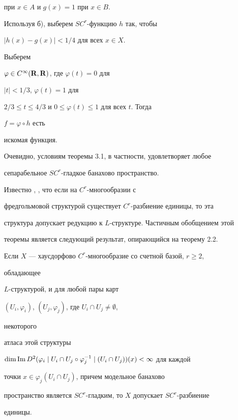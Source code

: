 \begin{pf}
при $x\in A$ и $g(x)=1$ при $x\in B$.


Используя б), выберем $SC^r$-функцию $h$ так, чтобы


$|h(x)-g(x)|<1/4$ для всех $x\in X$.


Выберем


$\varphi\in C^\infty(\bold R,\bold R)$, где $\varphi(t)=0$ для


$|t|<1/3$, $\varphi(t)=1$ для


$2/3\le t\le 4/3$ и $0\le\varphi(t)\le 1$ для всех $t$. Тогда


$f=\varphi\circ h$ есть


искомая функция.


\end{pf}





Очевидно, условиям теоремы 3.1, в частности, удовлетворяет любое


сепарабельное $SC^r$-гладкое банахово пространство.





Известно \cite{17}, \cite{9}, что если на $C^r$-многообразии с


фредгольмовой структурой существует $C^r$-разбиение единицы, то эта


структура допускает редукцию к $L$-структуре. Частичным обобщением этой


теоремы является следующий результат, опирающийся на теорему 2.2.





\begin{cors}


Если $X$ --- хаусдорфово $C^r$-многообразие со счетной базой, $r\ge 2$,


обладающее


$L$-структурой, и для любой пары карт


$(U_i,\varphi_i)$, $(U_j,\varphi_j)$, где $U_i\cap U_j\ne\emptyset$,


некоторого


атласа этой структуры


$\dim\im D^2(\varphi_i\mid U_i\cap U_j\circ\varphi^{-1}_j\mid


(U_i\cap U_j))(x)<\infty$ для каждой


точки $x\in\varphi_j(U_i\cap U_j)$, причем модельное банахово


пространство является $SC^r$-гладким, то $X$ допускает $SC^r$-разбиение


единицы.


\end{cors}





